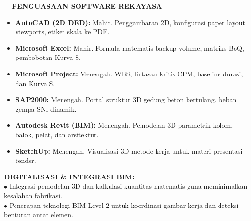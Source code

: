 \documentclass[10pt,a4paper,landscape]{article}
\begin{document}
\hfill
\begin{minipage}[t]{0.32\linewidth}
  \vspace{0pt}
  \begin{tcolorbox}[sharp corners, boxrule=0.8pt, colframe=pborder, colback=white, left=3mm, right=3mm, top=2.5mm, bottom=2.5mm, height=100mm]
    \colorbox{pnavy}{\fontsize{7pt}{8pt}\selectfont\bfseries\color{white}\ \ PENGUASAAN SOFTWARE REKAYASA\ \ }\\[1.5mm]

    {\fontsize{6.7pt}{8.4pt}\selectfont\color{psteel}
    \begin{itemize}[leftmargin=3mm, itemsep=0.6mm, topsep=0mm]
      \item \textbf{AutoCAD (2D DED):} Mahir. Penggambaran 2D, konfigurasi paper layout viewports, etiket skala ke PDF.
      \item \textbf{Microsoft Excel:} Mahir. Formula matematis backup volume, matriks BoQ, pembobotan Kurva S.
      \item \textbf{Microsoft Project:} Menengah. WBS, lintasan kritis CPM, baseline durasi, dan Kurva S.
      \item \textbf{SAP2000:} Menengah. Portal struktur 3D gedung beton bertulang, beban gempa SNI dinamik.
      \item \textbf{Autodesk Revit (BIM):} Menengah. Pemodelan 3D parametrik kolom, balok, pelat, dan arsitektur.
      \item \textbf{SketchUp:} Menengah. Visualisasi 3D metode kerja untuk materi presentasi tender.
    \end{itemize}
    }
  \end{tcolorbox}
  \vspace{2mm}

  \begin{tcolorbox}[sharp corners, boxrule=0.6pt, colframe=pnavy, colback=pbglight, left=2.5mm, right=2.5mm, top=2mm, bottom=2mm, height=52mm]
    {\fontsize{7pt}{8.5pt}\selectfont\bfseries\color{pnavy}DIGITALISASI \& INTEGRASI BIM:}\\[1.5mm]
    {\fontsize{6.5pt}{8.2pt}\selectfont\color{psteel}
    $\bullet$ Integrasi pemodelan 3D dan kalkulasi kuantitas matematis guna meminimalkan kesalahan fabrikasi.\\
    $\bullet$ Penerapan teknologi BIM Level 2 untuk koordinasi gambar kerja dan deteksi benturan antar elemen.
    }
  \end{tcolorbox}
\end{minipage}%
\hfill
\end{document}

